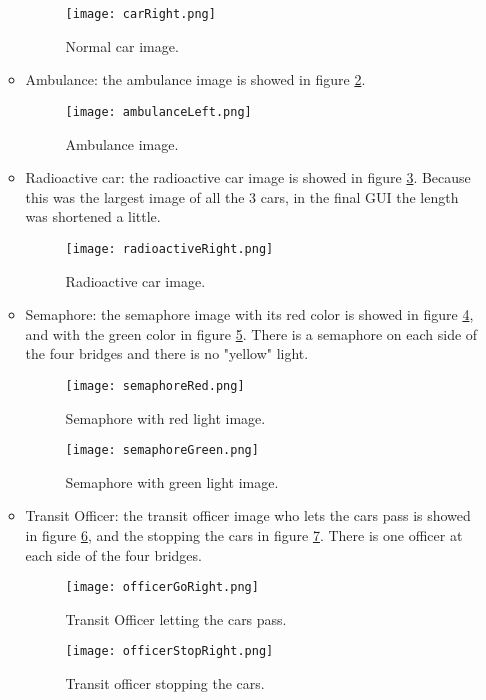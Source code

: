 \documentclass[a4paper,9pt]{article}
\begin{document}
\begin{itemize}
\begin{itemize}
\begin{figure}[H]
\centering
\texttt{[image: carRight.png]}
\caption{Normal car image.}
\label{fig:Car}
 \end{figure} \bigskip


\item Ambulance: the ambulance image is showed in figure \ref{fig:Ambulance}.

\begin{figure}[H]
\centering
\texttt{[image: ambulanceLeft.png]}
\caption{Ambulance image.}
\label{fig:Ambulance}
 \end{figure} \bigskip

\item Radioactive car: the radioactive car image is showed in figure \ref{fig:Radioactive}. Because this was the largest image of all the 3 cars, in the final GUI the length was shortened a little. 

\begin{figure}[H]
\centering
\texttt{[image: radioactiveRight.png]}
\caption{Radioactive car image.}
\label{fig:Radioactive}
 \end{figure} \bigskip

\item Semaphore: the semaphore image with its red color is showed in figure \ref{fig:SemaphoreRed}, and with the green color in figure \ref{fig:SemaphoreGreen}. There is a semaphore on each side of the four bridges and there is no "yellow" light.

\begin{figure}[H]
\centering
\texttt{[image: semaphoreRed.png]}
\caption{Semaphore with red light image.}
\label{fig:SemaphoreRed}
 \end{figure} \bigskip

\begin{figure}[H]
\centering
\texttt{[image: semaphoreGreen.png]}
\caption{Semaphore with green light image.}
\label{fig:SemaphoreGreen}
 \end{figure} \bigskip
 
\item Transit Officer: the transit officer image who lets the cars pass is showed in figure \ref{fig:OfficerGo}, and the stopping the cars in figure \ref{fig:OfficerStop}. There is one officer at each side of the four bridges.
\begin{figure}[H]
\centering
\texttt{[image: officerGoRight.png]}
\caption{Transit Officer letting the cars pass.}
\label{fig:OfficerGo}
 \end{figure} \bigskip

\begin{figure}[H]
\centering
\texttt{[image: officerStopRight.png]}
\caption{Transit officer stopping the cars.}
\label{fig:OfficerStop}
 \end{figure} \bigskip

\end{itemize}

\end{itemize}
\end{document}
